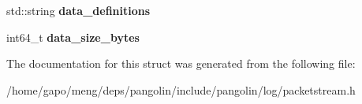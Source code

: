 \begin{DoxyCompactItemize}
\item 
std\+::string {\bfseries data\+\_\+definitions}\hypertarget{structpangolin_1_1_packet_stream_source_ab1203cf37bab135465db99b0bdfd6be6}{}\label{structpangolin_1_1_packet_stream_source_ab1203cf37bab135465db99b0bdfd6be6}

\item 
int64\+\_\+t {\bfseries data\+\_\+size\+\_\+bytes}\hypertarget{structpangolin_1_1_packet_stream_source_a988591b8374aa1457766ae7202e8b9e6}{}\label{structpangolin_1_1_packet_stream_source_a988591b8374aa1457766ae7202e8b9e6}

\end{DoxyCompactItemize}


The documentation for this struct was generated from the following file\+:\begin{DoxyCompactItemize}
\item 
/home/gapo/meng/deps/pangolin/include/pangolin/log/packetstream.\+h\end{DoxyCompactItemize}
